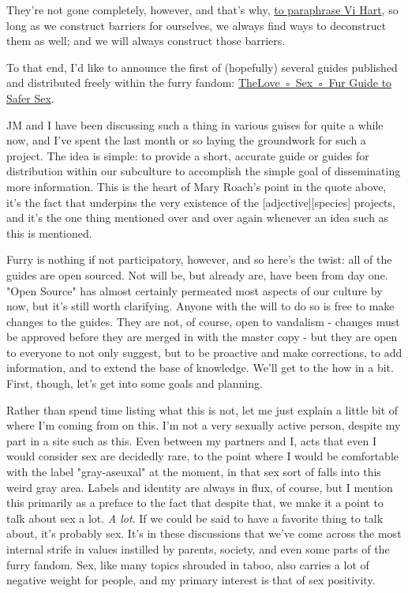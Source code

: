 They're not gone completely, however, and that's why, \href{http://www.youtube.com/watch?v=4niz8TfY794}{to paraphrase Vi Hart}, so long as we construct barriers for ourselves, we always find ways to deconstruct them as well; and we will always construct those barriers.

To that end, I'd like to announce the first of (hopefully) several guides published and distributed freely within the furry fandom: \href{http://guides.lovesexfur.com/safer-sex}{TheLove ◦ Sex ◦ Fur Guide to Safer Sex}.

JM and I have been discussing such a thing in various guises for quite a while now, and I've spent the last month or so laying the groundwork for such a project. The idea is simple: to provide a short, accurate guide or guides for distribution within our subculture to accomplish the simple goal of disseminating more information. This is the heart of Mary Roach's point in the quote above, it's the fact that underpins the very existence of the {[}adjective{]}{[}species{]} projects, and it's the one thing mentioned over and over again whenever an idea such as this is mentioned.

Furry is nothing if not participatory, however, and so here's the twist: all of the guides are open sourced. Not will be, but already are, have been from day one. "Open Source" has almost certainly permeated most aspects of our culture by now, but it's still worth clarifying. Anyone with the will to do so is free to make changes to the guides. They are not, of course, open to vandalism - changes must be approved before they are merged in with the master copy - but they are open to everyone to not only suggest, but to be proactive and make corrections, to add information, and to extend the base of knowledge. We'll get to the how in a bit. First, though, let's get into some goals and planning.

Rather than spend time listing what this is not, let me just explain a little bit of where I'm coming from on this. I'm not a very sexually active person, despite my part in a site such as this. Even between my partners and I, acts that even I would consider sex are decidedly rare, to the point where I would be comfortable with the label "gray-aseuxal" at the moment, in that sex sort of falls into this weird gray area. Labels and identity are always in flux, of course, but I mention this primarily as a preface to the fact that despite that, we make it a point to talk about sex a lot. \emph{A lot}. If we could be said to have a favorite thing to talk about, it's probably sex. It's in these discussions that we've come across the most internal strife in values instilled by parents, society, and even some parts of the furry fandom. Sex, like many topics shrouded in taboo, also carries a lot of negative weight for people, and my primary interest is that of sex positivity.\emph{\\
}

